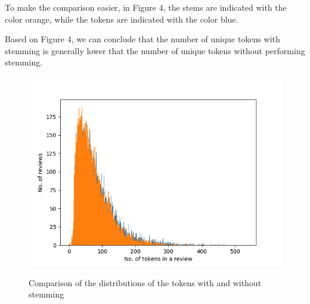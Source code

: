 To make the comparison easier, in Figure 4, the stems are indicated with the color orange, while the tokens are indicated with the color blue.

Based on Figure 4, we can conclude that the number of unique tokens with stemming is generally lower that the number of unique tokens without performing stemming.

\begin{figure}
    \centering
    \caption{Comparison of the distributions of the tokens with and without stemming}
    \includegraphics[scale=0.5]{figures/token_stem_review.png}
    \label{fig:stem_and_token_review}
\end{figure}

